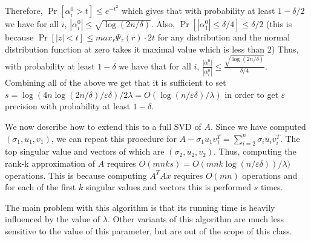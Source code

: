 \documentclass{article}
\newcommand{\eps}{\varepsilon}
\begin{document}
Therefore, $\Pr[\alpha^{0}_i > t] \le e^{-t^2}$ which gives that with probability at least $1-\delta/2$ we have for
all $i$, $|\alpha^{0}_i | \le \sqrt{\log(2n/\delta)}$. Also, $\Pr[|\alpha^{0}_1 | \le \delta/4 ] \le \delta/2$ (this is because 
$\Pr[|z| < t] \le max_{r}\Psi_{z}(r)\cdot2t$ for any distribution and the normal distribution function at zero takes it maximal value which is less than $2$) 
Thus, with probability at least $1-\delta$ we have that for all $i$, $\frac{|\alpha^{0}_{1}|}{|\alpha^{0}_{i}|} \le \frac{\sqrt{\log(2n/\delta)}}{\delta/4}$.
Combining all of the above we get that it is sufficient to set $s = \log(4n\log(2n/\delta)/\eps\delta)/2\lambda = O(\log(n/\eps\delta)/\lambda)$
in order to get $\eps$ precision with probability at least $1-\delta$.

We now describe how to extend this to a full SVD of $A$. Since we have computed $(\sigma_1,u_1,v_1)$, we can repeat this
procedure for $A - \sigma_{1}u_{1}v_{1}^{T} = \sum_{i=2}^{n}{\sigma_{i}u_{i}v_{i}^{T}}$. The top singular value and vectors of which are $(\sigma_2,u_2,v_2)$.
Thus, computing the rank-k approximation of $A$ requires $O(mnks)  = O(mnk\log(n/\eps\delta))/\lambda)$ operations. 
This is because computing $A^{T}Ax$ requires $O(mn)$ operations and
for each of the first $k$ singular values and vectors this is performed $s$ times. 

The main problem with this algorithm is that its running time is heavily influenced by the value of $\lambda$.
Other variants of this algorithm are much less sensitive to the value of this parameter, but are out of the scope of this class. 
\end{document}
